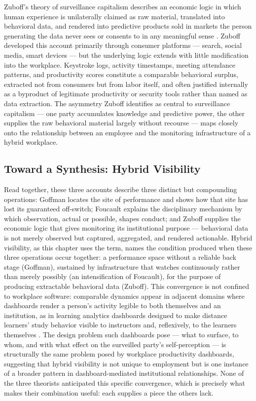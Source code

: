 \documentclass[12pt, a4paper]{article}
\begin{document}
Zuboff's theory of surveillance capitalism describes an economic logic in which human experience is unilaterally claimed as raw material, translated into behavioral data, and rendered into predictive products sold in markets the person generating the data never sees or consents to in any meaningful sense \parencite{zuboff2019age}. Zuboff developed this account primarily through consumer platforms --- search, social media, smart devices --- but the underlying logic extends with little modification into the workplace. Keystroke logs, activity timestamps, meeting attendance patterns, and productivity scores constitute a comparable behavioral surplus, extracted not from consumers but from labor itself, and often justified internally as a byproduct of legitimate productivity or security tools rather than named as data extraction. The asymmetry Zuboff identifies as central to surveillance capitalism --- one party accumulates knowledge and predictive power, the other supplies the raw behavioral material largely without recourse --- maps closely onto the relationship between an employee and the monitoring infrastructure of a hybrid workplace.

\subsection{Toward a Synthesis: Hybrid Visibility}

Read together, these three accounts describe three distinct but compounding operations: Goffman locates the site of performance and shows how that site has lost its guaranteed off-switch; Foucault explains the disciplinary mechanism by which observation, actual or possible, shapes conduct; and Zuboff supplies the economic logic that gives monitoring its institutional purpose --- behavioral data is not merely observed but captured, aggregated, and rendered actionable. Hybrid visibility, as this chapter uses the term, names the condition produced when these three operations occur together: a performance space without a reliable back stage (Goffman), sustained by infrastructure that watches continuously rather than merely possibly (an intensification of Foucault), for the purpose of producing extractable behavioral data (Zuboff). This convergence is not confined to workplace software: comparable dynamics appear in adjacent domains where dashboards render a person's activity legible to both themselves and an institution, as in learning analytics dashboards designed to make distance learners' study behavior visible to instructors and, reflexively, to the learners themselves \parencite{rets2021exploring}. The design problem such dashboards pose --- what to surface, to whom, and with what effect on the surveilled party's self-perception --- is structurally the same problem posed by workplace productivity dashboards, suggesting that hybrid visibility is not unique to employment but is one instance of a broader pattern in dashboard-mediated institutional relationships. None of the three theorists anticipated this specific convergence, which is precisely what makes their combination useful: each supplies a piece the others lack.
\end{document}
